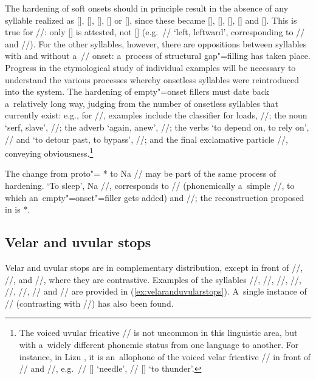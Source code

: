 			The hardening of soft onsets should in principle result in the absence of any syllable realized as
			[], [], [], [] or [], since these became [],
			[], [], [] and []. This is true for //: only [] is
			attested, not [] (e.g.~// ‘left, leftward’, corresponding to  // and
			 //). For the other syllables, however, there are oppositions between syllables with
			and without a~// onset: a~process of structural gap"=filling has taken place. Progress in the
			etymological study of individual examples will be necessary to understand the various processes
			whereby onsetless syllables were reintroduced into the system. The hardening of empty"=onset fillers
			must date back a~relatively long way, judging from the number of onsetless syllables that currently
			exist: e.g., for //, examples include the classifier for loads, //; the noun ‘serf, slave’, //; the adverb ‘again, anew’, //; the verbs ‘to depend on, to rely on’,
			// and ‘to detour past, to bypass’,
			//; and the final exclamative particle //, conveying obviousness.\footnote{The voiced uvular fricative // is not uncommon in this linguistic area,
				but with a~widely different phonemic status from one language to another. For instance, in {Lizu}
				\citep{chirkovaetal2012}, it is an~allophone of the voiced velar fricative // in front of
				// and //, e.g.~// [] ‘needle’, // [] ‘to
				thunder’.}
			
			The change from proto"= * to Na // may be part of the same process of hardening. ‘To
			sleep’, Na //, corresponds to  // (phonemically a~simple //, to which
			an~empty"=onset"=filler gets added) and  //; the reconstruction proposed in \citet{jacquesetal2011} is *.
			
			
			\subsection{Velar and uvular stops}
			\label{sec:velaranduvularstops}
			
			
			Velar and uvular stops are in complementary distribution, except in front of  //,
			//, and  //, where they are contrastive. Examples of the syllables  //,
			//,  //,  //,  //,  //,  // and  // are
			provided in (\ref{ex:velaranduvularstops}). A~single instance of  // (contrasting with  //) has also
			been found.
			
